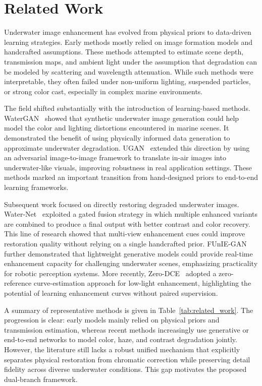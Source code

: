 \section{Related Work} \label{sec:related_work}

Underwater image enhancement has evolved from physical priors to data-driven learning strategies. Early methods mostly relied on image formation models and handcrafted assumptions. These methods attempted to estimate scene depth, transmission maps, and ambient light under the assumption that degradation can be modeled by scattering and wavelength attenuation. While such methods were interpretable, they often failed under non-uniform lighting, suspended particles, or strong color cast, especially in complex marine environments.

The field shifted substantially with the introduction of learning-based methods. WaterGAN~\cite{li2018watergan} showed that synthetic underwater image generation could help model the color and lighting distortions encountered in marine scenes. It demonstrated the benefit of using physically informed data generation to approximate underwater degradation. UGAN~\cite{fabbri2018ugan} extended this direction by using an adversarial image-to-image framework to translate in-air images into underwater-like visuals, improving robustness in real application settings. These methods marked an important transition from hand-designed priors to end-to-end learning frameworks.

Subsequent work focused on directly restoring degraded underwater images. Water-Net~\cite{li2019waternet} exploited a gated fusion strategy in which multiple enhanced variants are combined to produce a final output with better contrast and color recovery. This line of research showed that multi-view enhancement cues could improve restoration quality without relying on a single handcrafted prior. FUnIE-GAN~\cite{islam2020funie} further demonstrated that lightweight generative models could provide real-time enhancement capacity for challenging underwater scenes, emphasizing practicality for robotic perception systems. More recently, Zero-DCE~\cite{guo2020zerodce} adopted a zero-reference curve-estimation approach for low-light enhancement, highlighting the potential of learning enhancement curves without paired supervision.

A summary of representative methods is given in Table~\ref{tab:related_work}. The progression is clear: early models mainly relied on physical priors and transmission estimation, whereas recent methods increasingly use generative or end-to-end networks to model color, haze, and contrast degradation jointly. However, the literature still lacks a robust unified mechanism that explicitly separates physical restoration from chromatic correction while preserving detail fidelity across diverse underwater conditions. This gap motivates the proposed dual-branch framework.


